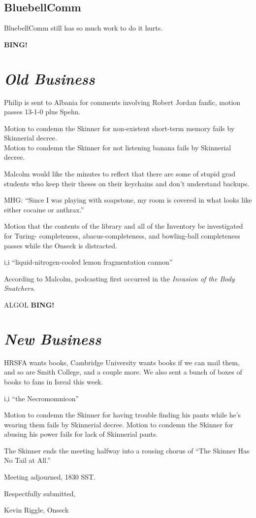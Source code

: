 \documentclass[10pt]{article}
\newcommand{\bing}{{\bf BING!} }
\newcommand{\goto}[1]{\bing \vskip 12pt \section*{{\em{#1}}}}
\newcommand{\ps}{ plus Spehn\xspace}
\begin{document}
\subsection*{BluebellComm}
BluebellComm still has so much work to do it hurts.

\goto{Old Business}

Philip is sent to Albania for comments involving Robert Jordan fanfic, motion passes 13-1-0\ps.

Motion to condemn the Skinner for non-existent short-term memory fails by Skinnerial decree.\\
Motion to condemn the Skinner for not listening banana fails by Skinnerial decree.

Malcolm would like the minutes to reflect that there are some of stupid grad students who keep
their theses on their keychains and don't understand backups.

MHG: ``Since I was playing with soapstone, my room is covered in what looks like either cocaine
or anthrax.''

Motion that the contents of the library and all of the Inventory be investigated for Turing-
completeness, abacus-completeness, and bowling-ball completeness passes while the Onseck is
distracted.

i,i ``liquid-nitrogen-cooled lemon fragmentation cannon''

According to Malcolm, podcasting first occurred in the \emph{Invasion of the Body Snatchers}.



ALGOL
\goto{New Business}

HRSFA wants books, Cambridge University wants books if we can mail them, and so are Smith College, 
and a 
couple more.  We also sent a bunch of boxes of books to fans in Isreal this week.

i,i ``the Necromomnicon''

Motion to condemn the Skinner for having trouble finding his pants while he's wearing them fails 
by Skinnerial decree.
Motion to condemn the Skinner for abusing his power fails for lack of Skinnerial pants.

The Skinner ends the meeting halfway into a rousing chorus of ``The Skinner Has No Tail at All.''

\vspace{12pt}

\noindent
Meeting adjourned, 1830 SST.

\vspace{18pt}

\centerline{Respectfully submitted,}
\centerline{Kevin Riggle, Onseck}
\end{document}
